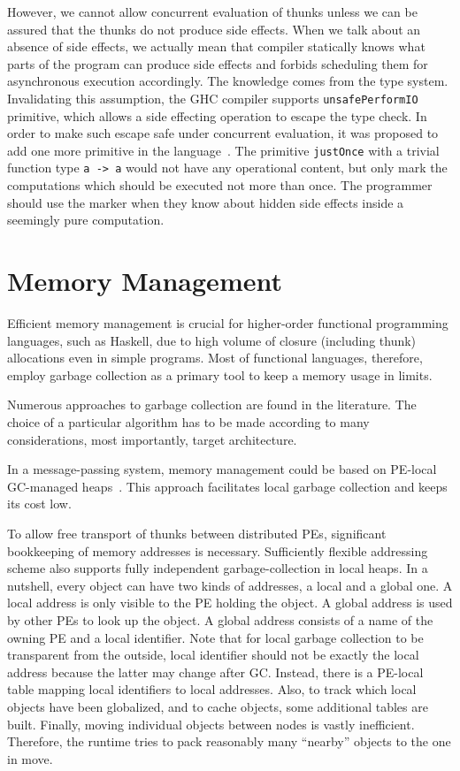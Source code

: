 \documentclass[11pt]{extarticle}
\begin{document}
However, we cannot allow concurrent evaluation of thunks unless we can be assured that the thunks do not produce side effects.
When we talk about an absence of side effects, we actually mean that compiler statically knows what parts of the program can produce side effects and forbids scheduling them for asynchronous execution accordingly. The knowledge comes from the type system. Invalidating this assumption, the GHC compiler supports \texttt{unsafePerformIO} primitive, which allows a side effecting operation to escape the type check. In order to make such escape safe under concurrent evaluation, it was proposed to add one more primitive in the language~\cite{Harris05}. The primitive \texttt{justOnce} with a trivial function type \texttt{a -> a} would not have any operational content, but only mark the computations which should be executed not more than once. The programmer should use the marker when they know about hidden side effects inside a seemingly pure computation.

\section{Memory Management}

Efficient memory management is crucial for higher-order functional programming languages, such as Haskell, due to high volume of closure (including thunk) allocations even in simple programs. Most of functional languages, therefore, employ garbage collection as a primary tool to keep a memory usage in limits.

Numerous approaches to garbage collection are found in the literature. The choice of a particular algorithm has to be made according to many considerations, most importantly, target architecture. 

In a message-passing system, memory management could be based on PE-local GC-managed heaps~\cite{Trinder96}. This approach facilitates local garbage collection and keeps its cost low. 

To allow free transport of thunks between distributed PEs, significant bookkeeping of memory addresses is necessary. Sufficiently flexible addressing scheme also supports fully independent garbage-collection in local heaps. In a nutshell, every object can have two kinds of addresses, a local and a global one. A local address is only visible to the PE holding the object. A global address is used by other PEs to look up the object. A global address consists of a name of the owning PE and a local identifier. Note that for local garbage collection to be transparent from the outside, local identifier should not be exactly the local address because the latter may change after GC. Instead, there is a PE-local table mapping local identifiers to local addresses. Also, to track which local objects have been globalized, and to cache objects, some additional tables are built. Finally, moving individual objects between nodes is vastly inefficient. Therefore, the runtime tries to pack reasonably many ``nearby'' objects to the one in move.
\end{document}
